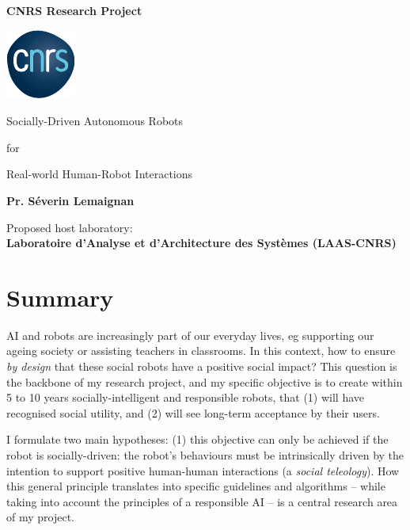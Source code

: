 \documentclass[12pt,a4paper]{article}
\title{\project}
\begin{document}
\begin{center}

    \textbf{\LARGE CNRS Research Project}

    \vspace{1cm}
    \includegraphics[width=0.2\linewidth]{CNRS.pdf}


    \vspace{3cm}
    {\Huge Socially-Driven Autonomous Robots}

    \vspace{0.5cm}
    {\LARGE for}

    \vspace{0.5cm}
    {\Huge Real-world Human-Robot Interactions}

    \vspace{2cm}
    {\LARGE\bf Pr. Séverin Lemaignan}

    \vspace{3cm}
    {\Large Proposed host laboratory:\\ \bf Laboratoire d'Analyse et d'Architecture des Systèmes (LAAS-CNRS)}
\end{center}

    \vspace{3cm}

\newpage

\section*{Summary}\label{abstract}


AI and robots are increasingly part of our
everyday lives, eg supporting our ageing society or assisting teachers in
classrooms. In this context, how to ensure \emph{by design} that these social robots
have a positive social impact? This question is the backbone of my
research project, and my specific objective is to create within 5 to 10 years
socially-intelligent and responsible robots, that (1) will have recognised
social utility, and (2) will see long-term acceptance by their users.

I formulate two main hypotheses: (1) this objective can only be achieved if the
robot is socially-driven: the robot's behaviours must be intrinsically driven by
the intention to support positive human-human interactions (a \emph{social
teleology}). How this general principle translates into specific guidelines and
algorithms -- while taking into account the principles of a responsible AI -- is
a central research area of my project.
\end{document}
